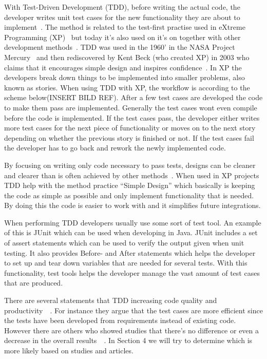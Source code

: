 With Test-Driven Development (TDD), before writing the actual code, the developer writes unit test cases for the new functionality they are about to implement~\cite{beckTestDriven}. The method is related to the test-first practise used in eXtreme Programming (XP)~\cite{beckXP} but today it’s also used on it’s on together with other development methods~\cite{MSNET}. TDD was used in the 1960’ in the NASA Project Mercury~\cite{NASA} and then rediscovered by Kent Beck (who created XP) in 2003 who claims that it encourages simple design and inspires confidence~\cite{beckXP}. In XP the developers break down things to be implemented into smaller problems, also known as stories. When using TDD with XP, the workflow is according to the scheme below(INSERT BILD REF). After a few test cases are developed the code to make them pass are implemented. Generally the test cases wont even compile before the code is implemented. If the test cases pass, the developer either writes more test cases for the next piece of functionality or moves on to the next story depending on whether the previous story is finished or not. If the test cases fail the developer has to go back and rework the newly implemented code.

By focusing on writing only code necessary to pass tests, designs can be cleaner and clearer than is often achieved by other methods~\cite{beckXP}. When used in XP projects TDD help with the method practice “Simple Design” which basically is keeping the code as simple as possible and only implement functionality that is needed. By doing this the code is easier to work with and it simplifies future integrations. 

When performing TDD developers usually use some sort of test tool. An example of this is JUnit which can be used when developing in Java. JUnit includes a set of assert statements which can be used to verify the output given when unit testing. It also provides Before- and After statements which helps the developer to set up and tear down variables that are needed for several tests. With this functionality, test tools helps the developer manage the vast amount of test cases that are produced.

There are several statements that TDD increasing code quality and productivity~\cite{beckXP}~\cite{erdogmus}. For instance they argue that the test cases are more efficient since the tests have been developed from requirements instead of existing code. However there are others who showed studies that there’s no difference or even a decrease in the overall results~\cite{tddInvest}~\cite{mullerandhagner}. In Section 4 we will try to determine which is more likely based on studies and articles.

